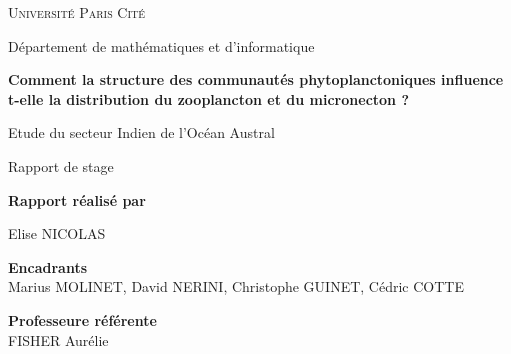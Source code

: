 \documentclass{article}
\begin{document}
	
	\begin{titlepage}
		\centering
		\vspace{0.5em}
		
		{\scshape\LARGE Université Paris Cité \par}
		\vspace{0.4cm}
		{\large Département de mathématiques et d'informatique}
		
		\vspace{1cm}  
		
		{\Large \bfseries Comment la structure des communautés phytoplanctoniques influence t-elle la distribution du zooplancton et du micronecton ?\par}
		\vspace{0.1cm}
		{\Large  Etude du secteur Indien de l'Océan Austral}\\
		\vspace{0.2cm}
		{\Large  Rapport de stage\par}
		
		\vspace{1cm}
		
		\begin{abstract}
			
		\end{abstract}
		
		\vspace{1cm}
		
		{\large \textbf{Rapport réalisé par}}\\[0.2cm]
		{\large Elise NICOLAS\par}
		
		\vspace{0.6cm}
		
		{\large \textbf{Encadrants}}\\[0.2cm]
		{\large Marius MOLINET, David NERINI, Christophe GUINET, Cédric COTTE}
		
		\vspace{0.6cm}
		
		{\large \textbf{Professeure référente}}\\[0.2cm]
		{\large FISHER Aurélie}
		
		
		
		\vspace{0.8cm} 
		
		{\large \date{} \par}
	\end{titlepage}
	
	\clearpage
	\tableofcontents
	
\end{document}
